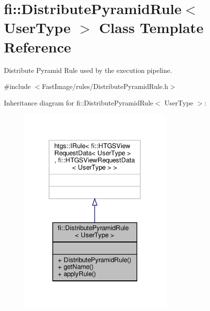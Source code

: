 \hypertarget{classfi_1_1DistributePyramidRule}{}\section{fi\+:\+:Distribute\+Pyramid\+Rule$<$ User\+Type $>$ Class Template Reference}
\label{classfi_1_1DistributePyramidRule}


Distribute Pyramid Rule used by the execution pipeline.  




{\ttfamily \#include $<$Fast\+Image/rules/\+Distribute\+Pyramid\+Rule.\+h$>$}



Inheritance diagram for fi\+:\+:Distribute\+Pyramid\+Rule$<$ User\+Type $>$\+:
\nopagebreak
\begin{figure}[H]
\begin{center}
\leavevmode
\includegraphics[width=221pt]{dc/d96/classfi_1_1DistributePyramidRule__inherit__graph}
\end{center}
\end{figure}


